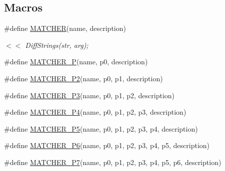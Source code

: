 \subsection*{Macros}
\begin{DoxyCompactItemize}
\item 
\#define \mbox{\hyperlink{_obj__test_2lib_2googletest-master_2googlemock_2include_2gmock_2gmock-generated-matchers_8h_af4fe73ff8e2b0494f4970b575b65ddff}{M\+A\+T\+C\+H\+ER}}(name,  description)
\begin{DoxyCompactList}\small\item\em $<$$<$ Diff\+Strings(str, arg); \end{DoxyCompactList}\item 
\#define \mbox{\hyperlink{_obj__test_2lib_2googletest-master_2googlemock_2include_2gmock_2gmock-generated-matchers_8h_acb7ae915efa2fd8d3f6ea7313198afb6}{M\+A\+T\+C\+H\+E\+R\+\_\+P}}(name,  p0,  description)
\item 
\#define \mbox{\hyperlink{_obj__test_2lib_2googletest-master_2googlemock_2include_2gmock_2gmock-generated-matchers_8h_a78efce3ad21c8f68223f5c2d09f2e79d}{M\+A\+T\+C\+H\+E\+R\+\_\+\+P2}}(name,  p0,  p1,  description)
\item 
\#define \mbox{\hyperlink{_obj__test_2lib_2googletest-master_2googlemock_2include_2gmock_2gmock-generated-matchers_8h_a507103c6251f8bf4393ec119d9e34d34}{M\+A\+T\+C\+H\+E\+R\+\_\+\+P3}}(name,  p0,  p1,  p2,  description)
\item 
\#define \mbox{\hyperlink{_obj__test_2lib_2googletest-master_2googlemock_2include_2gmock_2gmock-generated-matchers_8h_a6ec420ed6bc3ad073f19a4e32dd1f38f}{M\+A\+T\+C\+H\+E\+R\+\_\+\+P4}}(name,  p0,  p1,  p2,  p3,  description)
\item 
\#define \mbox{\hyperlink{_obj__test_2lib_2googletest-master_2googlemock_2include_2gmock_2gmock-generated-matchers_8h_a3a9589cd79e2dbdb4e09981510c9c42e}{M\+A\+T\+C\+H\+E\+R\+\_\+\+P5}}(name,  p0,  p1,  p2,  p3,  p4,  description)
\item 
\#define \mbox{\hyperlink{_obj__test_2lib_2googletest-master_2googlemock_2include_2gmock_2gmock-generated-matchers_8h_aceda758bb064965b2b9a7e0e96085861}{M\+A\+T\+C\+H\+E\+R\+\_\+\+P6}}(name,  p0,  p1,  p2,  p3,  p4,  p5,  description)
\item 
\#define \mbox{\hyperlink{_obj__test_2lib_2googletest-master_2googlemock_2include_2gmock_2gmock-generated-matchers_8h_a2948ce54387a83c33fa98ba0c73eb11f}{M\+A\+T\+C\+H\+E\+R\+\_\+\+P7}}(name,  p0,  p1,  p2,  p3,  p4,  p5,  p6,  description)

\end{DoxyCompactItemize}
